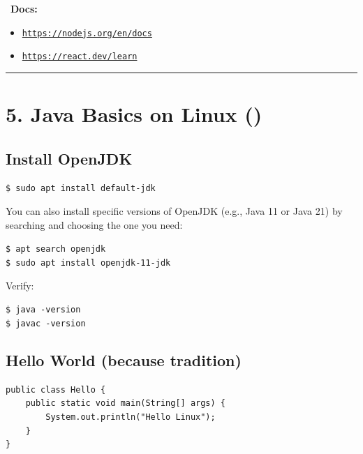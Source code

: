 \documentclass[12pt]{article}
\newcommand{\javaicon}{\faJava}
\newcommand{\bookicon}{\faBook}
\begin{document}
\begin{infobox}
\bookicon\ \textbf{Docs:}
\begin{itemize}
    \item \href{https://nodejs.org/en/docs}{\texttt{https://nodejs.org/en/docs}}
    \item \href{https://react.dev/learn}{\texttt{https://react.dev/learn}}
\end{itemize}
\end{infobox}

\vspace{1em}
\begin{center}
\color{teamred}\rule{0.8\textwidth}{1pt}
\end{center}

\section*{5. Java Basics on Linux (\javaicon)}

\subsection*{Install OpenJDK}

\begin{highlightbox}
\texttt{\$ sudo apt install default-jdk}
\end{highlightbox}

You can also install specific versions of OpenJDK (e.g., Java 11 or Java 21) by searching and choosing the one you need:

\begin{highlightbox}
\texttt{\$ apt search openjdk}\\
\texttt{\$ sudo apt install openjdk-11-jdk}
\end{highlightbox}

Verify:

\begin{highlightbox}
\texttt{\$ java -version}\\
\texttt{\$ javac -version}
\end{highlightbox}

\subsection*{Hello World (because tradition)}

\begin{highlightbox}
\begin{verbatim}
public class Hello {
    public static void main(String[] args) {
        System.out.println("Hello Linux");
    }
}
\end{verbatim}
\end{highlightbox}
\end{document}

